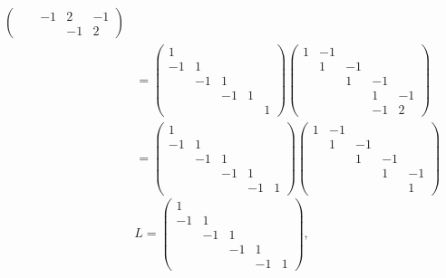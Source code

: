 \documentclass[a4paper,11pt]{article}
\begin{document}
\begin{enumerate}
\begin{align*}
\begin{pmatrix}
                &  & -1 & 2 & -1 \\
                &  &  & -1 & 2
             \end{pmatrix} \\
          &= \begin{pmatrix}
               1 &  &  &  &  \\
               -1 & 1 &  &  &  \\
                & -1 & 1 &  &  \\
                &  & -1 & 1 &  \\
                &  &  &  & 1
             \end{pmatrix}
             \begin{pmatrix}
               1 & -1 &  &  &  \\
                & 1 & -1 &  &  \\
                &  & 1 & -1 &  \\
                &  &  & 1 & -1 \\
                &  &  & -1 & 2
             \end{pmatrix} \\
          &= \begin{pmatrix}
               1 &  &  &  &  \\
               -1 & 1 &  &  &  \\
                & -1 & 1 &  &  \\
                &  & -1 & 1 &  \\
                &  &  & -1 & 1
             \end{pmatrix}
             \begin{pmatrix}
               1 & -1 &  &  &  \\
                & 1 & -1 &  &  \\
                &  & 1 & -1 &  \\
                &  &  & 1 & -1 \\
                &  &  &  & 1
             \end{pmatrix}
      \end{align*}
      $$ L = \begin{pmatrix}
               1 &  &  &  &  \\
               -1 & 1 &  &  &  \\
                & -1 & 1 &  &  \\
                &  & -1 & 1 &  \\
                &  &  & -1 & 1
             \end{pmatrix},
$$
\end{enumerate}
\end{document}
